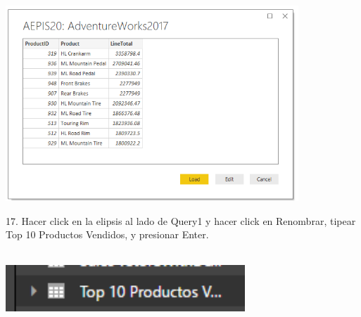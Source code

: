 \documentclass[12pt,letterpaper]{article}
\begin{document}
\begin{center}
\includegraphics[width=11cm]{IMG/4.png} 
\end{center}
17. Hacer click en la elipsis al lado de Query1 y hacer click en Renombrar, tipear Top 10 Productos
Vendidos, y presionar Enter.\\\\
\begin{center}
\includegraphics[width=9cm]{IMG/5.png} 
\end{center}
\end{document}
